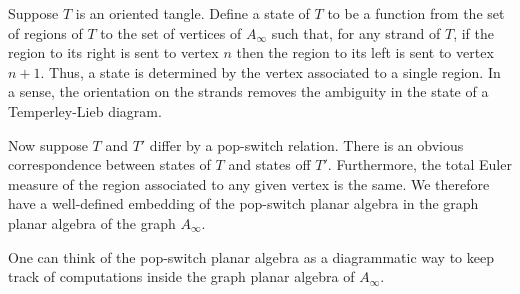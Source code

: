 Suppose $T$ is an oriented tangle.
Define a state of $T$
to be a function from the set of regions of $T$
to the set of vertices of $A_\infty$
such that,
for any strand of $T$,
if the region to its right is sent to vertex $n$
then the region to its left is sent to vertex $n+1$.
Thus,
a state is determined by the vertex associated to a single region.
In a sense,
the orientation on the strands
removes the ambiguity in the state of a Temperley-Lieb diagram.

Now suppose $T$ and $T'$ differ by a pop-switch relation.
There is an obvious correspondence between
states of $T$ and states off $T'$.
Furthermore,
the total Euler measure of the region associated to any given vertex is the same.
We therefore have
a well-defined embedding
of the pop-switch planar algebra
in the graph planar algebra of the graph $A_\infty$.

One can think of the pop-switch planar algebra
as a diagrammatic way to keep track of
computations inside the graph planar algebra of $A_\infty$.